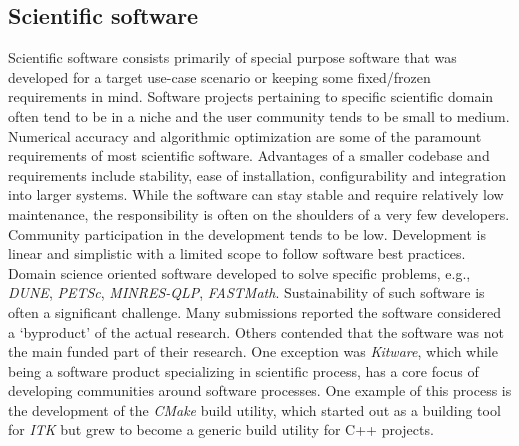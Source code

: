 \documentclass[11pt, oneside]{amsart}
\begin{document}
\subsection{Scientific software}
Scientific software consists primarily of special purpose software that was developed for a target use-case
scenario or keeping some fixed/frozen requirements in mind. Software projects
pertaining to specific scientific domain often tend to be in a niche and the
user community tends to be small to medium. Numerical accuracy and algorithmic
optimization are some of the paramount requirements of most scientific
software. Advantages of a smaller codebase and requirements include stability,
ease of installation, configurability and integration into larger systems.
While the software can stay stable and require relatively low maintenance, the
responsibility is often on the shoulders of a very few developers. Community
participation in the development tends to be low. Development is linear and
simplistic with a limited scope to follow software best practices. Domain
science oriented software developed to solve  specific problems, e.g.,
\emph{DUNE}, \emph{PETSc}, \emph{MINRES-QLP}, \emph{FASTMath}. Sustainability
of such software is often a significant challenge. Many submissions reported the
software considered a `byproduct' of the actual research.  Others contended that
the software was not the main funded part of their research. One exception was
\emph{Kitware}, which while being a software product specializing in scientific
process, has a core focus of developing communities around software processes.
One example of this process is the development of the \emph{CMake} build
utility, which started out as a building tool for \emph{ITK} but grew to become
a generic build utility for C++ projects. 
\end{document}
